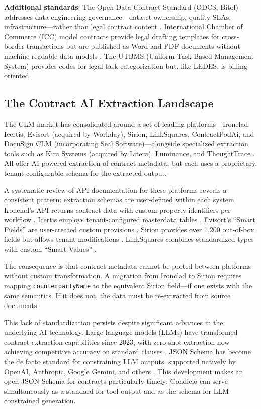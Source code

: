 \documentclass[11pt,a4paper]{article}
\begin{document}
\textbf{Additional standards}. The Open Data Contract Standard (ODCS, Bitol) addresses data engineering governance---dataset ownership, quality SLAs, infrastructure---rather than legal contract content \cite{odcs}. International Chamber of Commerce (ICC) model contracts provide legal drafting templates for cross-border transactions but are published as Word and PDF documents without machine-readable data models \cite{icc-models}. The UTBMS (Uniform Task-Based Management System) provides codes for legal task categorization but, like LEDES, is billing-oriented.

\subsection{The Contract AI Extraction Landscape}

The CLM market has consolidated around a set of leading platforms---Ironclad, Icertis, Evisort (acquired by Workday), Sirion, LinkSquares, ContractPodAi, and DocuSign CLM (incorporating Seal Software)---alongside specialized extraction tools such as Kira Systems (acquired by Litera), Luminance, and ThoughtTrace \cite{clm-vendors}. All offer AI-powered extraction of contract metadata, but each uses a proprietary, tenant-configurable schema for the extracted output.

A systematic review of API documentation for these platforms reveals a consistent pattern: extraction schemas are user-defined within each system. Ironclad's API returns contract data with custom property identifiers per workflow \cite{ironclad-api}. Icertis employs tenant-configured masterdata tables \cite{icertis-api}. Evisort's ``Smart Fields'' are user-created custom provisions \cite{evisort-api}. Sirion provides over 1,200 out-of-box fields but allows tenant modifications \cite{sirion-api}. LinkSquares combines standardized types with custom ``Smart Values'' \cite{linksquares-api}.

The consequence is that contract metadata cannot be ported between platforms without custom transformation. A migration from Ironclad to Sirion requires mapping \texttt{counterpartyName} to the equivalent Sirion field---if one exists with the same semantics. If it does not, the data must be re-extracted from source documents.

This lack of standardization persists despite significant advances in the underlying AI technology. Large language models (LLMs) have transformed contract extraction capabilities since 2023, with zero-shot extraction now achieving competitive accuracy on standard clauses \cite{olava-extract}. JSON Schema has become the de facto standard for constraining LLM outputs, supported natively by OpenAI, Anthropic, Google Gemini, and others \cite{sourcemeta-json-schema}. This development makes an open JSON Schema for contracts particularly timely: Condicio can serve simultaneously as a standard for tool output and as the schema for LLM-constrained generation.
\end{document}
